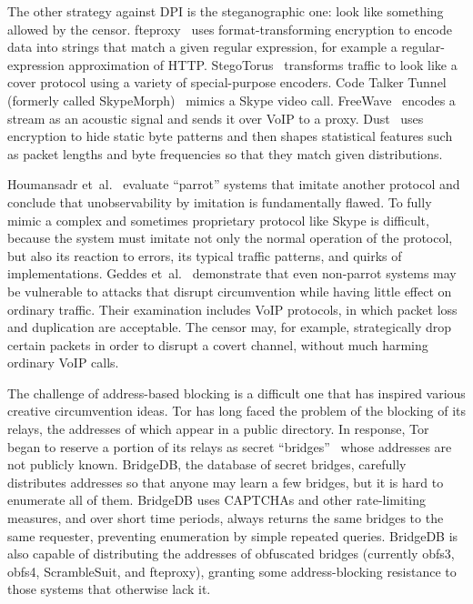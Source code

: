 \documentclass{sig-alternate}
\begin{document}
The other strategy against DPI is the steganographic one: look like
something allowed by the censor.
fteproxy~\cite{fte} uses format-transforming encryption to encode data into strings
that match a given regular expression,
for example a regular-expression approximation of HTTP.
StegoTorus~\cite{stegotorus}
transforms traffic to look like a cover protocol
using a variety of special-purpose encoders.
Code Talker
Tunnel (formerly called SkypeMorph)~\cite{skypemorph} mimics a Skype video call.
FreeWave~\cite{freewave} encodes a stream as an acoustic signal
and sends it over VoIP to a proxy.
Dust~\cite{dust} uses encryption to hide static byte patterns and then
shapes statistical features such as packet lengths and byte frequencies so that they
match given distributions.

Houmansadr et~al.~\cite{parrot} evaluate ``parrot'' systems that imitate another protocol
and conclude that unobservability by imitation is fundamentally flawed.
To fully mimic a complex and sometimes proprietary protocol like Skype
is difficult,
because the system must imitate not only the normal operation of the protocol,
but also its reaction to errors,
its typical traffic patterns, and quirks of implementations.
Geddes et~al.~\cite{acks}
demonstrate that even non-parrot systems may be vulnerable to
attacks that disrupt circumvention while having little effect
on ordinary traffic.
Their examination includes VoIP protocols,
in which packet loss and duplication are acceptable.
The censor may, for example, strategically drop certain packets
in order to disrupt a covert channel, without much harming ordinary VoIP calls.


The challenge of address-based blocking is a difficult one
that has inspired various creative circumvention ideas.
Tor has long faced the problem of the blocking of its relays,
the addresses of which appear in a public directory.
In response, Tor began to reserve a portion of its
relays as secret ``bridges''~\cite{tor-blocking}
whose addresses are not publicly known.
BridgeDB, the database of secret bridges,
carefully distributes addresses
so that anyone may learn a few bridges, but it is hard to enumerate all of them.
BridgeDB uses CAPTCHAs and other rate-limiting measures,
and over short time periods,
always returns the same bridges to the same requester,
preventing enumeration by simple repeated queries.
BridgeDB is also capable of distributing the addresses
of obfuscated bridges (currently obfs3, obfs4, ScrambleSuit, and fteproxy),
granting some address-blocking resistance to those systems that otherwise lack it.
\end{document}

